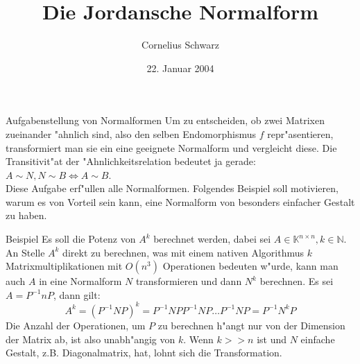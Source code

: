 \documentclass[a4paper]{article}
\author{Cornelius Schwarz}
\title{Die Jordansche Normalform}
\date{22. Januar 2004}
\begin{document}
\maketitle
\begin{section}{Aufgabenstellung von Normalformen}
Um zu entscheiden, ob zwei Matrixen zueinander "ahnlich sind, also den selben Endomorphismus $f$ repr"asentieren, transformiert man sie ein eine geeignete Normalform und vergleicht diese. Die Transitivit"at der "Ahnlichkeitsrelation bedeutet ja gerade: $A \sim N, N \sim B \Leftrightarrow A \sim B$.\\
Diese Aufgabe erf"ullen alle Normalformen. Folgendes Beispiel soll motivieren, warum es von Vorteil sein kann, eine Normalform von besonders einfacher Gestalt zu haben.
\begin{subsection}{Beispiel}
Es soll die Potenz von $A^k$ berechnet werden, dabei sei $A \in \mathbb{K}^{n \times n}, k \in \mathbb{N}$. An Stelle $A^k$ direkt zu berechnen, was mit einem nativen Algorithmus $k$ Matrixmultiplikationen mit $O(n^3)$ Operationen bedeuten w"urde, kann man auch $A$ in eine Normalform $N$ transformieren und dann $N^k$ berechnen. Es sei $A=P^{-1}nP$, dann gilt:
$$A^k=(P^{-1}NP)^k = P^{-1} N P P^{-1} N P \ldots P^{-1} N P = P^{-1} N^k P$$
Die Anzahl der Operationen, um $P$ zu berechnen h"angt nur von der Dimension der Matrix ab, ist also unabh"angig von $k$. Wenn $k >> n$ ist und $N$ einfache Gestalt, z.B. Diagonalmatrix, hat, lohnt sich die Transformation.
\end{subsection}
\end{section}
\end{document}
